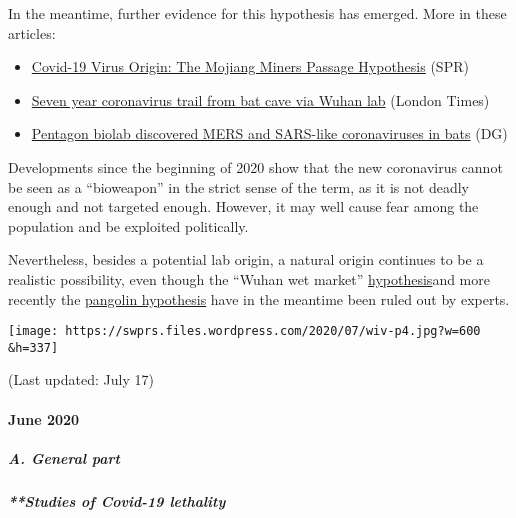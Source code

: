 In the meantime, further evidence for this hypothesis has emerged. More
in these articles:

\begin{itemize}
\tightlist
\item
  \href{https://swprs.org/covid-19-virus-origin-the-mojiang-miners-passage-hypothesis/}{Covid-19
  Virus Origin: The Mojiang Miners Passage Hypothesis} (SPR)
\item
  \href{https://www.thetimes.co.uk/article/seven-year-covid-trail-revealed-l5vxt7jqp}{Seven
  year coronavirus trail from bat cave via Wuhan lab} (London Times)
\item
  \href{https://armswatch.com/project-g-2101-pentagon-biolab-discovered-mers-and-sars-like-coronaviruses-in-bats/}{Pentagon
  biolab discovered MERS and SARS-like coronaviruses in bats} (DG)
\end{itemize}

Developments since the beginning of 2020 show that the new coronavirus
cannot be seen as a ``bioweapon'' in the strict sense of the term, as it
is not deadly enough and not targeted enough. However, it may well cause
fear among the population and be exploited politically.

Nevertheless, besides a potential lab origin, a natural origin continues
to be a realistic possibility, even though the ``Wuhan wet market''
\href{https://thebulletin.org/2020/06/did-the-sars-cov-2-virus-arise-from-a-bat-coronavirus-research-program-in-a-chinese-laboratory-very-possibly}{hypothesis}and
more recently the
\href{https://www.news-medical.net/news/20200708/Research-sheds-doubt-on-the-Pangolin-link-to-SARS-CoV-2.aspx}{pangolin
hypothesis} have in the meantime been ruled out by experts.

\texttt{[image: https://swprs.files.wordpress.com/2020/07/wiv-p4.jpg?w=600\\\&h=337]}

(Last updated: July 17)

\hypertarget{june-2020}{%
\paragraph{June 2020}\label{june-2020}}

\hypertarget{a-general-part-1}{%
\subparagraph{\texorpdfstring{\textbf{A. General
part}}{A. General part}}\label{a-general-part-1}}

\hypertarget{studies-of-covid-19-lethality}{%
\subparagraph{**Studies of Covid-19
lethality}\label{studies-of-covid-19-lethality}}

